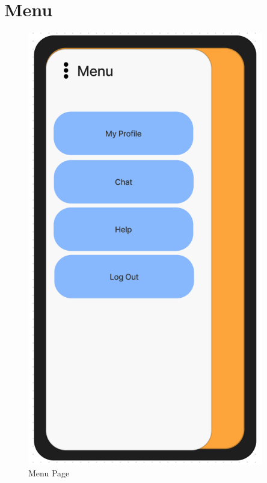 \documentclass[title page]{article}
\begin{document}
\section{Menu}
\begin{figure}[!h]
    \begin{center}
          \includegraphics[height=19cm]{images/menu.png}
          \caption{Menu Page}
          \label{fig:menu}
    \end{center}
\end{figure}
\end{document}
